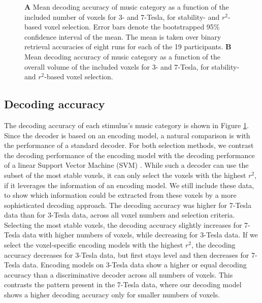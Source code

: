 \begin{figure}
  \centering
  \def\svgwidth{\linewidth}
  
	
  \caption{\textbf{A} Mean decoding accuracy of music category as a function of the included number of
  voxels for 3- and 7-Tesla, for stability- and $r^2$-based voxel selection. Error bars denote the bootstrapped 95\% confidence
  interval of the mean. The mean is taken over binary retrieval accuracies of
  eight runs for each of the 19 participants. \textbf{B} Mean decoding accuracy
  of music category as a function of the overall volume of the included voxels for 3- and 7-Tesla, for stability- and $r^2$-based voxel selection.}
 \label{fig:decoding_accuracy}
\end{figure}

\subsection*{Decoding accuracy}

The decoding accuracy of each stimulus's music category is shown in Figure
\ref{fig:decoding_accuracy}. Since the decoder is based on an encoding model, a
natural comparison is with the performance of a standard decoder. For both selection methods, we contrast the decoding
performance of the encoding model with the decoding performance of a linear Support
Vector Machine (SVM) \citep{FCH+08,V13}. While such a decoder can use the subset of the most stable voxels, it can only select the voxels with the highest $r^2$, if it leverages the information of an encoding model. We still include these data, to show which information could be extracted from these voxels by a more sophisticated decoding approach.  The decoding accuracy was higher for 7-Tesla data than for 3-Tesla data, across all voxel numbers and selection criteria.  Selecting the most stable voxels, the decoding accuracy slightly increases for 7-Tesla data with higher numbers of voxels, while decreasing for 3-Tesla data.
If we select the voxel-specific encoding models with the highest $r^2$, the
decoding accuracy decreases for 3-Tesla data, but first stays level and then
decreases for 7-Tesla data. Encoding models on 3-Tesla data show a higher or equal decoding accuracy than a discriminative decoder across all numbers of
voxels. This contrasts the pattern present in the 7-Tesla data, where our
decoding model shows a higher decoding accuracy only for smaller numbers of
voxels. %


